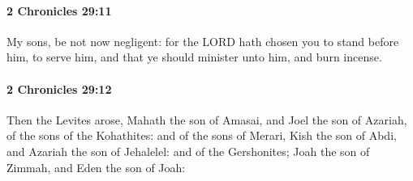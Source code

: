 		\paragraph{2 Chronicles 29:11} %
			\label{2CHRONICLES-29-11}

			My sons, be not now negligent: for the LORD hath chosen you to stand before him, to serve him, and that ye should minister unto him, and burn incense.


		\paragraph{2 Chronicles 29:12} %
			\label{2CHRONICLES-29-12}

			Then the Levites arose, Mahath the son of Amasai, and Joel the son of Azariah, of the sons of the Kohathites: and of the sons of Merari, Kish the son of Abdi, and Azariah the son of Jehalelel: and of the Gershonites; Joah the son of Zimmah, and Eden the son of Joah:

